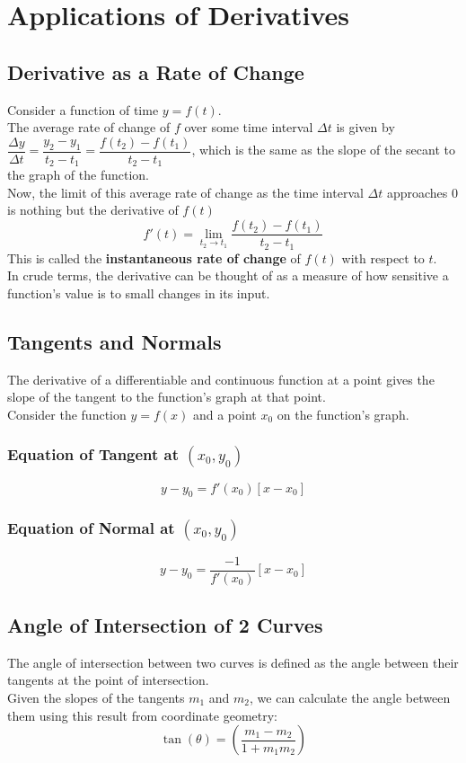 \documentclass[14]{article}
\theoremstyle{definition}
\theoremstyle{case}
\begin{document}
\section{Applications of Derivatives}
\subsection{Derivative as a Rate of Change}
Consider a function of time $y = f(t)$.\\
The average rate of change of $f$ over some time interval $\Delta t$ is given by $\dfrac{\Delta y}{\Delta t} = \dfrac{y_2 - y_1}{t_2 - t_1} = \dfrac{f(t_2) - f(t_1)}{t_2 - t_1}$, which is the same as the slope of the secant to the graph of the function.\\
Now, the limit of this average rate of change as the time interval $\Delta t$ approaches $0$ is nothing but the derivative of $f(t)$\\
\[
f'(t) = \lim\limits_{t_2 \to t_1} \dfrac{f(t_2) - f(t_1)}{t_2 - t_1}
\]
This is called the \textbf{instantaneous rate of change} of $f(t)$ with respect to $t$.\\
In crude terms, the derivative can be thought of as a measure of how sensitive a function's value is to small changes in its input.
\subsection{Tangents and Normals}
The derivative of a differentiable and continuous function at a point gives the slope of the tangent to the function's graph at that point.\\
Consider the function $y = f(x)$ and a point $x_0$ on the function's graph.
\subsubsection{Equation of Tangent at $(x_0, y_0)$}
\[
y - y_0 = f'(x_0) \left[x - x_0\right]
\]
\subsubsection{Equation of Normal at $(x_0, y_0)$}
\[
y - y_0 = \dfrac{-1}{f'(x_0)} \left[x - x_0\right]
\]
\subsection{Angle of Intersection of 2 Curves}
The angle of intersection between two curves is defined as the angle between their tangents at the point of intersection.\\
Given the slopes of the tangents $m_1$ and $m_2$, we can calculate the angle between them using this result from coordinate geometry:
\[\tan(\theta)= \left(\dfrac{m_1 - m_2}{1 + m_1 m_2}\right)\]
\pagebreak
\end{document}
